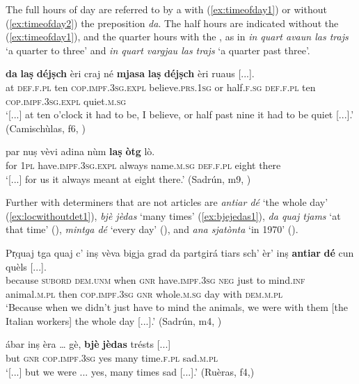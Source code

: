 The full hours of day are referred to by a  with (\ref{ex:timeofday1}) or without (\ref{ex:timeofday2}) the preposition \textit{da}. The half hours are indicated without the  (\ref{ex:timeofday1}), and the quarter hours with the , as in \textit{in quart avaun las trajs} `a quarter to three' and \textit{in quart vargjau las trajs} `a quarter past three'.

\ea
\label{ex:timeofday1}
\gll    [...] \textbf{da} \textbf{laṣ} \textbf{déjṣch} èri craj né \textbf{mjasa} \textbf{laṣ} \textbf{déjṣch} èri ruaus [...].\\
{} at \textsc{def.f.pl} ten \textsc{cop.impf.3sg.expl} believe.\textsc{prs.1sg} or half.\textsc{f.sg} \textsc{def.f.pl} ten \textsc{cop.impf.3sg.expl} quiet.\textsc{m.sg}\\
\glt `[...] at ten o’clock it had to be, I believe, or half past nine it had to be quiet [...].' (Camischùlas, f6, )
\z

\ea
\label{ex:timeofday2}
\gll [...] par nuṣ vèvi adina nùm \textbf{laṣ} \textbf{òtg} lò.   \\
{} for \textsc{1pl} have.\textsc{impf.3sg.expl} always name.\textsc{m.sg} \textsc{def.f.pl} eight there\\
\glt `[...] for us it always meant at eight there.' (Sadrún, m9, )
\z

Further  with determiners that are not articles are \textit{antiar dé} `the whole day' (\ref{ex:locwithoutdet1}), \textit{bjè jèdas} `many times' (\ref{ex:bjejedas1}), \textit{da quaj tjams} `at that time' (), \textit{mintga dé} `every day' (), and \textit{ana sjatònta} `in 1970' ().

\ea
\label{ex:locwithoutdet1}
\gll  Pr̩quaj tga quaj c’ inṣ vèva bigja grad da partgirá tiars sch’ èr’ inṣ \textbf{antiar} \textbf{dé} cun quèls [...].  \\
because \textsc{subord} \textsc{dem.unm} when \textsc{gnr} have.\textsc{impf.3sg}  \textsc{neg} just to mind.\textsc{inf} animal.\textsc{m.pl} then \textsc{cop.impf.3sg} \textsc{gnr} whole.\textsc{m.sg} day with \textsc{dem.m.pl}\\
\glt `Because when we didn’t just have to mind the animals, we were with them [the Italian workers] the whole day [...].' (Sadrún, m4, )
\z

\ea
\label{ex:bjejedas1}
\gll [...] ábar inṣ èra … gè,  \textbf{bjè} \textbf{jèdas} trésts [...]\\
{} but \textsc{gnr} \textsc{cop.impf.3sg} {} yes many time.\textsc{f.pl} sad.\textsc{m.pl}\\
\glt `[...] but we were ... yes, many times sad [...].' (Ruèras, f4,)
\z

